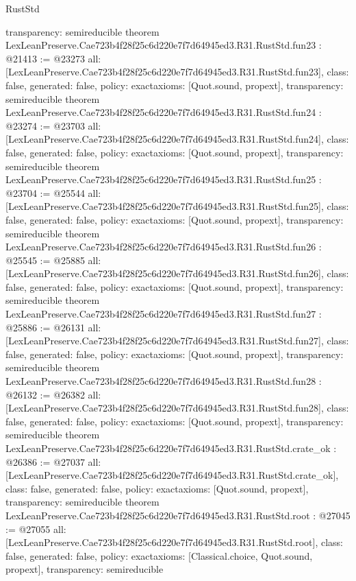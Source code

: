 \begin{lexlean}{RustStd}
\begin{coremodule}
{  transparency: semireducible
}
theorem LexLeanPreserve.Cae723b4f28f25c6d220e7f7d64945ed3.R31.RustStd.fun23 : @21413 := @23273 {
  all: [LexLeanPreserve.Cae723b4f28f25c6d220e7f7d64945ed3.R31.RustStd.fun23],
  class: false,
  generated: false,
  policy: exact{axioms: [Quot.sound, propext]},
  transparency: semireducible
}
theorem LexLeanPreserve.Cae723b4f28f25c6d220e7f7d64945ed3.R31.RustStd.fun24 : @23274 := @23703 {
  all: [LexLeanPreserve.Cae723b4f28f25c6d220e7f7d64945ed3.R31.RustStd.fun24],
  class: false,
  generated: false,
  policy: exact{axioms: [Quot.sound, propext]},
  transparency: semireducible
}
theorem LexLeanPreserve.Cae723b4f28f25c6d220e7f7d64945ed3.R31.RustStd.fun25 : @23704 := @25544 {
  all: [LexLeanPreserve.Cae723b4f28f25c6d220e7f7d64945ed3.R31.RustStd.fun25],
  class: false,
  generated: false,
  policy: exact{axioms: [Quot.sound, propext]},
  transparency: semireducible
}
theorem LexLeanPreserve.Cae723b4f28f25c6d220e7f7d64945ed3.R31.RustStd.fun26 : @25545 := @25885 {
  all: [LexLeanPreserve.Cae723b4f28f25c6d220e7f7d64945ed3.R31.RustStd.fun26],
  class: false,
  generated: false,
  policy: exact{axioms: [Quot.sound, propext]},
  transparency: semireducible
}
theorem LexLeanPreserve.Cae723b4f28f25c6d220e7f7d64945ed3.R31.RustStd.fun27 : @25886 := @26131 {
  all: [LexLeanPreserve.Cae723b4f28f25c6d220e7f7d64945ed3.R31.RustStd.fun27],
  class: false,
  generated: false,
  policy: exact{axioms: [Quot.sound, propext]},
  transparency: semireducible
}
theorem LexLeanPreserve.Cae723b4f28f25c6d220e7f7d64945ed3.R31.RustStd.fun28 : @26132 := @26382 {
  all: [LexLeanPreserve.Cae723b4f28f25c6d220e7f7d64945ed3.R31.RustStd.fun28],
  class: false,
  generated: false,
  policy: exact{axioms: [Quot.sound, propext]},
  transparency: semireducible
}
theorem LexLeanPreserve.Cae723b4f28f25c6d220e7f7d64945ed3.R31.RustStd.crate_ok : @26386 := @27037 {
  all: [LexLeanPreserve.Cae723b4f28f25c6d220e7f7d64945ed3.R31.RustStd.crate_ok],
  class: false,
  generated: false,
  policy: exact{axioms: [Quot.sound, propext]},
  transparency: semireducible
}
theorem LexLeanPreserve.Cae723b4f28f25c6d220e7f7d64945ed3.R31.RustStd.root : @27045 := @27055 {
  all: [LexLeanPreserve.Cae723b4f28f25c6d220e7f7d64945ed3.R31.RustStd.root],
  class: false,
  generated: false,
  policy: exact{axioms: [Classical.choice, Quot.sound, propext]},
  transparency: semireducible
}


\end{coremodule}
\end{lexlean}

